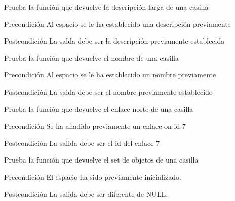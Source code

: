 \begin{DoxyRefList}
\item[\label{test__test000279}%
\hypertarget{test__test000279}{}%
Global \hyperlink{space__test_8c_aaec8bbc606d2e3294f4efbe7c102d482}{test1\-\_\-space\-\_\-get\-\_\-long\-\_\-description} ()]Prueba la función que devuelve la descripción larga de una casilla \begin{DoxyPrecond}{Precondición}
Al espacio se le ha establecido una descripción previamente 
\end{DoxyPrecond}
\begin{DoxyPostcond}{Postcondición}
La salda debe ser la descripción previamente establecida  
\end{DoxyPostcond}

\item[\label{test__test000273}%
\hypertarget{test__test000273}{}%
Global \hyperlink{space__test_8c_ad12c42523c517507566c5c68b1527689}{test1\-\_\-space\-\_\-get\-\_\-name} ()]Prueba la función que devuelve el nombre de una casilla \begin{DoxyPrecond}{Precondición}
Al espacio se le ha establecido un nombre previamente 
\end{DoxyPrecond}
\begin{DoxyPostcond}{Postcondición}
La salda debe ser el nombre previamente establecido  
\end{DoxyPostcond}

\item[\label{test__test000286}%
\hypertarget{test__test000286}{}%
Global \hyperlink{space__test_8c_a3a87f1e1e173d622bfbd3bcd14e060ca}{test1\-\_\-space\-\_\-get\-\_\-north} ()]Prueba la función que devuelve el enlace norte de una casilla \begin{DoxyPrecond}{Precondición}
Se ha añadido previamente un enlace on id 7 
\end{DoxyPrecond}
\begin{DoxyPostcond}{Postcondición}
La salida debe ser el id del enlace 7  
\end{DoxyPostcond}

\item[\label{test__test000284}%
\hypertarget{test__test000284}{}%
Global \hyperlink{space__test_8c_a30ccffb300d95f8db99bf7a5f1d57352}{test1\-\_\-space\-\_\-get\-\_\-objects} ()]Prueba la función que devuelve el set de objetos de una casilla \begin{DoxyPrecond}{Precondición}
El espacio ha sido previamente inicializado. 
\end{DoxyPrecond}
\begin{DoxyPostcond}{Postcondición}
La salida debe ser diferente de N\-U\-L\-L.  
\end{DoxyPostcond}


\end{DoxyRefList}
